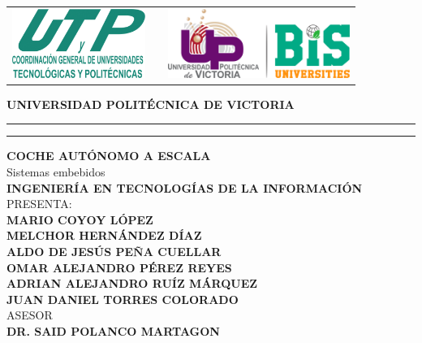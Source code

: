 \documentclass[12pt]{article}
\date{\specialdate\today}
\newcommand{\HRule}{\rule{\linewidth}{0.25mm}}
\newcommand{\ncarrera}            {Ingeniería en Tecnologías de la Información}
\newcommand{\nasesorinstitucional}{Dr. Said Polanco Martagon}
\newcommand{\NombreAlumno}{
    Mario Coyoy López \\
    Melchor Hernández Díaz \\
    Aldo de Jesús Peña Cuellar \\
    Omar Alejandro Pérez Reyes \\
    Adrian Alejandro Ruíz Márquez \\
    Juan Daniel Torres Colorado
}
\newcommand{\NombreProyecto}{Coche autónomo a escala}
\newcommand{\organismoreceptor}   {Universidad Politécnica de Victoria}
\newcommand{\nasesorempresaria}   {MSI. José Fidencio López Luna}
\newcommand{\separacionCorta}{0.0cm}
\newcommand{\separacionLarga}{0.5cm}
\newcommand{\iemph}[1]{\MakeTextUppercase{#1}}
\begin{document}
\setcounter{page}{1}
\thispagestyle{empty}

\begin{center}

\begin{tabular}{cp{5cm}c}
\includegraphics[height=2.25cm]{UTYP.png} & 
& \includegraphics[height=2.25cm]{LogoUPV_2023.png}   \\
\end{tabular}

\Large \textbf{UNIVERSIDAD POLITÉCNICA DE VICTORIA}
\vspace{0.5cm}
\hrule
\vspace{0.1cm} 
\hrule
\vspace{0.5cm}


\textbf{\iemph{\NombreProyecto}} \\[\separacionLarga]
Sistemas embebidos\\
\textbf{\iemph{\ncarrera}} \\[\separacionLarga]

PRESENTA: \\[\separacionCorta]
\textbf{\iemph{\NombreAlumno}}\\[\separacionLarga]


ASESOR \\[\separacionCorta]
\textbf{\iemph{\nasesorinstitucional}} \\[\separacionCorta]



\end{center}
\vspace{4cm}
\end{document}
